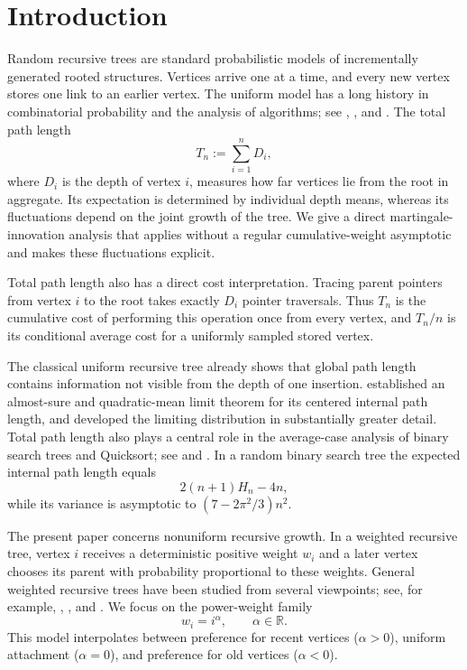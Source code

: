 \documentclass[11pt,a4paper]{article}
\newcommand{\1}{\mathbf{1}}
\newcommand{\R}{\mathbb{R}}
\begin{document}
\section{Introduction}\label{sec:intro}
Random recursive trees are standard probabilistic models of incrementally generated rooted structures.
Vertices arrive one at a time, and every new vertex stores one link to an earlier vertex.
The uniform model has a long history in combinatorial probability and the analysis of algorithms; see
\citet{Szymanski1990}, \citet{SmytheMahmoud1995}, and \citet{Drmota2009}.
The total path length
\[
T_n:=\sum_{i=1}^n D_i,
\]
where $D_i$ is the depth of vertex $i$, measures how far vertices lie from the root in aggregate.
Its expectation is determined by individual depth means, whereas its fluctuations depend on the joint growth of the tree.
We give a direct martingale-innovation analysis that applies without a regular cumulative-weight asymptotic and makes these fluctuations explicit.

Total path length also has a direct cost interpretation.
Tracing parent pointers from vertex $i$ to the root takes exactly $D_i$ pointer traversals.
Thus $T_n$ is the cumulative cost of performing this operation once from every vertex,
and $T_n/n$ is its conditional average cost for a uniformly sampled stored vertex.

The classical uniform recursive tree already shows that global path length
contains information not visible from the depth of one insertion.
\citet{Mahmoud1991} established an almost-sure and quadratic-mean limit theorem
for its centered internal path length, and \citet{DobrowFill1999} developed
the limiting distribution in substantially greater detail.  Total path
length also plays a central role in the average-case analysis of binary search
trees and Quicksort; see \citet{Knuth1998} and
\citet{FlajoletSedgewick2009}.  In a random binary search tree the expected
internal path length equals
\[
2(n+1)H_n-4n,
\]
while its variance is asymptotic to
$(7-2\pi^2/3)n^2$.

The present paper concerns nonuniform recursive growth.  In a weighted
recursive tree, vertex $i$ receives a deterministic positive weight $w_i$ and
a later vertex chooses its parent with probability proportional to these
weights.  General weighted recursive trees have been studied from several
viewpoints; see, for example, \citet{BorovkovVatutin2006},
\citet{HiesmayrIslak2020}, and \citet{Senizergues2021}.  We focus on the
power-weight family
\[
w_i=i^\alpha,\qquad \alpha\in\R.
\]
This model interpolates between preference for recent vertices
($\alpha>0$), uniform attachment ($\alpha=0$), and preference for old
vertices ($\alpha<0$).
\end{document}
